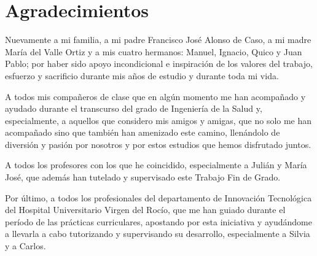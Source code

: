 \chapter*{Agradecimientos}

Nuevamente a mi familia, a mi padre Francisco José Alonso de Caso, a mi madre María del Valle Ortiz y a mis cuatro hermanos: Manuel, Ignacio, Quico y Juan Pablo; por haber sido apoyo incondicional e inspiración de los valores del trabajo, esfuerzo y sacrificio durante mis años de estudio y durante toda mi vida.

A todos mis compañeros de clase que en algún momento me han acompañado y ayudado durante el transcurso del grado de Ingeniería de la Salud y, especialmente, a aquellos que considero mis amigos y amigas, que no solo me han acompañado sino que también han amenizado este camino, llenándolo de diversión y pasión por nosotros y por estos estudios que hemos disfrutado juntos.

A todos los profesores con los que he coincidido, especialmente a Julián y María José, que además han tutelado y supervisado este Trabajo Fin de Grado.

Por último, a todos los profesionales del departamento de Innovación Tecnológica del Hospital Universitario Virgen del Rocío, que me han guiado durante el período de las prácticas curriculares, apostando por esta iniciativa y ayudándome a llevarla a cabo tutorizando y supervisando su desarrollo, especialmente a Silvia y a Carlos.

